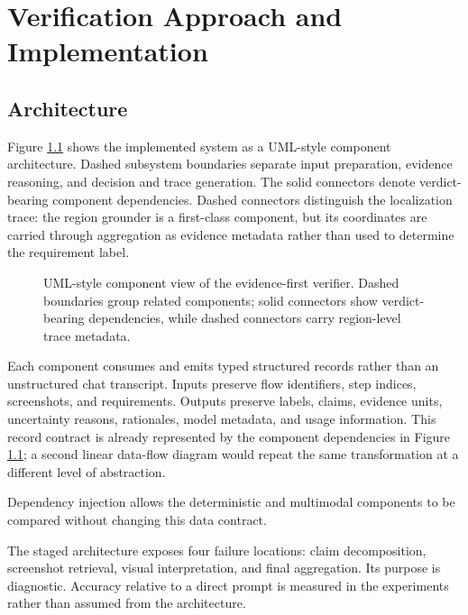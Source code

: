 \chapter{Verification Approach and Implementation}\label{verification-approach-and-implementation}

\section{Architecture}\label{architecture}

Figure \ref{fig:evidence-first-architecture} shows the implemented system as a
UML-style component architecture. Dashed subsystem boundaries separate input
preparation, evidence reasoning, and decision and trace generation. The
solid connectors denote verdict-bearing component dependencies. Dashed
connectors distinguish the localization trace: the region grounder is a
first-class component, but its coordinates are carried through aggregation as
evidence metadata rather than used to determine the requirement label.

\begin{figure}[htbp]
  \centering
  \resizebox{\textwidth}{!}{}
  \caption{UML-style component view of the evidence-first verifier. Dashed
  boundaries group related components; solid connectors show verdict-bearing
  dependencies, while dashed connectors carry region-level trace metadata.}
  \label{fig:evidence-first-architecture}
\end{figure}

Each component consumes and emits typed structured records rather than an
unstructured chat transcript. Inputs preserve flow identifiers, step indices,
screenshots, and requirements. Outputs preserve labels, claims, evidence
units, uncertainty reasons, rationales, model metadata, and usage information.
This record contract is already represented by the component dependencies in
Figure \ref{fig:evidence-first-architecture}; a second linear data-flow diagram
would repeat the same transformation at a different level of abstraction.

Dependency injection allows the deterministic and multimodal components to be
compared without changing this data contract.

The staged architecture exposes four failure locations: claim decomposition,
screenshot retrieval, visual interpretation, and final aggregation. Its
purpose is diagnostic. Accuracy relative to a direct prompt is measured in the
experiments rather than assumed from the architecture.


